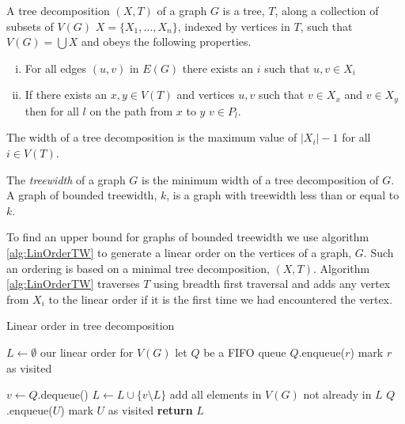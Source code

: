 \begin{definition}
    A tree decomposition $(X,T)$ of a graph $G$ is a tree, $T$, along a collection of subsets of $V(G)$ $X=\{X_1,\dots,X_n\}$, indexed by vertices in $T$, such that $V(G)=\bigcup X$ and obeys the following properties.
    \begin{enumerate}[(i)]
        \item For all edges $(u,v)$ in $E(G)$ there exists an $i$ such that $u,v\in X_i$
        \item  If there exists an $x,y\in V(T)$ and vertices $u,v$ such that $v\in X_x$ and $v\in X_y$ then for all $l$ on the path from $x$ to $y$ $v\in P_l$.
    \end{enumerate} 
    The width of a tree decomposition is the maximum value of $|X_i| -1$ for all $i\in V(T)$.
\end{definition}

\begin{definition}[Treewidth]
    The \textit{treewidth} of a graph $G$ is the minimum width of a tree decomposition of $G$.    
    A graph of bounded treewidth, $k$, is a graph with treewidth less than or equal to $k$. 
\end{definition}

To find an upper bound for graphs of bounded treewidth we use algorithm \ref{alg:LinOrderTW} to generate a linear order on the vertices of a graph, $G$. Such an ordering is based on a minimal tree decomposition, $(X,T)$. Algorithm \ref{alg:LinOrderTW} traverses $T$ using breadth first traversal and adds any vertex from $X_i$ to the linear order if it is the first time we  had encountered the vertex.

\begin{algorithm}[h]
    \caption{Linear order in tree decomposition}
    \label{alg:LinOrderTW}
    \begin{algorithmic}[1]
        
            \State $L \gets \emptyset$ \Comment our linear order for $V(G)$
            \State let $Q$ be a FIFO queue 
            \State $Q$.enqueue($r$)
            \State mark $r$ as visited
            
                \State $v \gets Q$.dequeue()
                \State $L \gets L \cup \{v\setminus L\}$ \Comment add all elements in $V(G)$ not already in $L$
                    \State $Q$.enqueue($U$)
                    \State mark $U$ as visited
                \EndFor        
            \EndWhile 
            \State \textbf{return}  $L$
        \EndFunction
    \end{algorithmic}
\end{algorithm}

